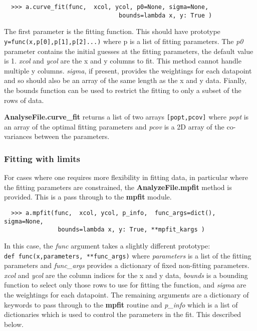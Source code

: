 \documentclass[a4paper,11pt]{scrartcl}
\begin{document}
\begin{verbatim}
  >>> a.curve_fit(func,  xcol, ycol, p0=None, sigma=None,
                                bounds=lambda x, y: True )
\end{verbatim}

The first parameter is the fitting function. This should have prototype \\\verb:y=func(x,p[0],p[1],p[2]...): where p is a list of fitting parameters. The \textit{p0} parameter contains the initial guesses at the fitting parameters, the default value is 1. \textit{xcol} and \textit{ycol} are the x and y columns to fit. This method cannot handle multiple y columns. \textit{sigma}, if present, provides the weightings for each datapoint and so should also be an array of the same length as the x and y data. Fianlly, the bounds function can be used to restrict the fitting to only a subset of the rows of data.

\textbf{AnalyseFile.curve\_fit} returns a list of two arrays \verb:[popt,pcov]: where \textit{popt} is an array of the optimal fitting parameters and \textit{pcov} is a 2D array of the co-variances between the parameters.

\subsubsection{Fitting with limits}

For cases where one requires more flexibility in fitting data, in particular where the fitting parameters are constrained, the \textbf{AnalyzeFile.mpfit} method is provided. This is a pass through to the \textbf{mpfit} module.

\begin{verbatim}
  >>> a.mpfit(func,  xcol, ycol, p_info,  func_args=dict(), sigma=None,
               bounds=lambda x, y: True, **mpfit_kargs )
\end{verbatim}

In this case, the \textit{func} argument takes a slightly different prototype:\\\verb:def func(x,parameters, **func_args): where \textit{parameters} is a list of the fitting parameters and \textit{func\_args} provides a dictionary of fixed \ie non-fitting parameters. \textit{xcol} and \textit{ycol} are the column indices for the x and y data, \textit{bounds} is a bounding function to select only those rows to use for fitting the function, and \textit{sigma} are the weightings for each datapoint. The remaining arguments are a dictionary of keywords to pass through to the \textbf{mpfit} routine and  \textit{p\_info} which is a list of dictionaries which is used to control the parameters in the fit. This described below.
\end{document}
